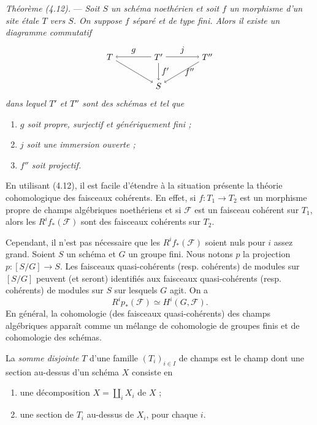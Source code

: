 \documentclass[10pt]{article}
\begin{document}
\medskip
\noindent\emph{Théorème (4.12).} --- \emph{Soit $S$ un schéma noethérien et soit $f$ un morphisme d'un site étale $T$ vers $S$. On suppose $f$ séparé et de type fini. Alors il existe un diagramme commutatif}
\[
\begin{tikzpicture}[baseline=(current bounding box.center)]
\node (T) at (0,1.2) {$T$};
\node (Tp) at (2.0,1.2) {$T'$};
\node (Tpp) at (4.0,1.2) {$T''$};
\node (S) at (2.0,0) {$S$};
\draw[->] (Tp) -- node[above] {$g$} (T);
\draw[->] (Tp) -- node[above] {$j$} (Tpp);
\draw[->] (T) -- (S);
\draw[->] (Tp) -- node[right] {$f'$} (S);
\draw[->] (Tpp) -- node[right] {$f''$} (S);
\end{tikzpicture}
\]
\emph{dans lequel $T'$ et $T''$ sont des schémas et tel que}
\begin{enumerate}[label=(\roman*)]
\item \emph{$g$ soit propre, surjectif et génériquement fini ;}
\item \emph{$j$ soit une immersion ouverte ;}
\item \emph{$f''$ soit projectif.}
\end{enumerate}

En utilisant (4.12), il est facile d'étendre à la situation présente la théorie cohomologique des faisceaux cohérents. En effet, si $f:T_1\to T_2$ est un morphisme propre de champs algébriques noethériens et si $\mathscr F$ est un faisceau cohérent sur $T_1$, alors les $R^if_*(\mathscr F)$ sont des faisceaux cohérents sur $T_2$.

Cependant, il n'est pas nécessaire que les $R^if_*(\mathscr F)$ soient nuls pour $i$ assez grand. Soient $S$ un schéma et $G$ un groupe fini. Nous notons $p$ la projection $p:[S/G]\to S$. Les faisceaux quasi-cohérents (resp. cohérents) de modules sur $[S/G]$ peuvent (et seront) identifiés aux faisceaux quasi-cohérents (resp. cohérents) de modules sur $S$ sur lesquels $G$ agit. On a
\[
R^i p_*(\mathscr F)\simeq H^i(G,\mathscr F).
\]
En général, la cohomologie (des faisceaux quasi-cohérents) des champs algébriques apparaît comme un mélange de cohomologie de groupes finis et de cohomologie des schémas.

La \emph{somme disjointe} $T$ d'une famille $(T_i)_{i\in I}$ de champs est le champ dont une section au-dessus d'un schéma $X$ consiste en
\begin{enumerate}[label=(\roman*)]
\item une décomposition $X=\coprod_i X_i$ de $X$ ;
\item une section de $T_i$ au-dessus de $X_i$, pour chaque $i$.
\end{enumerate}
\end{document}
